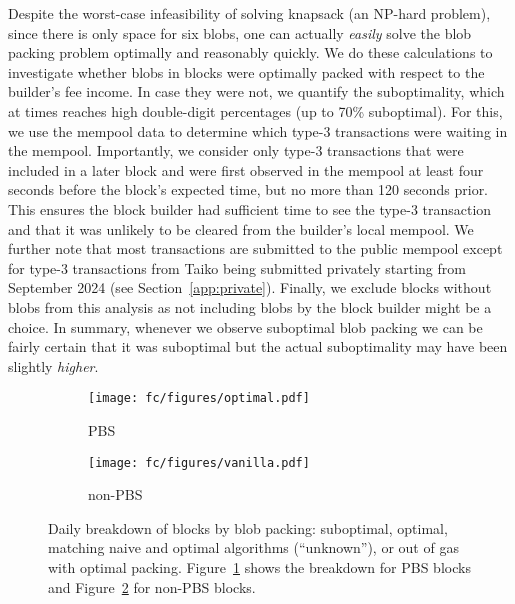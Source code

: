 Despite the worst-case infeasibility of solving knapsack (an NP-hard problem), since there is only space for six blobs, one can actually \emph{easily} solve the blob packing problem optimally and reasonably quickly. We do these calculations to investigate whether blobs in blocks were optimally packed with respect to the builder's fee income. In case they were not, we quantify the suboptimality, which at times reaches high double-digit percentages (up to 70\% suboptimal).
For this, we use the mempool data to determine which type-3 transactions were waiting in the mempool. Importantly, we consider only type-3 transactions that were included in a later block and were first observed in the mempool at least four seconds before the block's expected time, but no more than 120 seconds prior. This ensures the block builder had sufficient time to see the type-3 transaction and that it was unlikely to be cleared from the builder’s local mempool. We further note that most transactions are submitted to the public mempool except for type-3 transactions from Taiko being submitted privately starting from September 2024 (see Section~\ref{app:private}). Finally, we exclude blocks without blobs from this analysis as not including blobs by the block builder might be a choice. In summary, whenever we observe suboptimal blob packing we can be fairly certain that it was suboptimal but the actual suboptimality may have been slightly \emph{higher}.

\begin{figure}[t!]\vspace{-6pt}
    \centering
    \begin{subfigure}[t]{0.49\columnwidth}
    \centering
        \texttt{[image: fc/figures/optimal.pdf]}
    \caption{PBS}
    \label{fig:optimal}
    \end{subfigure}\hfill
    \begin{subfigure}[t]{0.49\columnwidth}
    \centering
        \texttt{[image: fc/figures/vanilla.pdf]}
    \caption{non-PBS}
    \label{fig:vanilla}
    \end{subfigure}\vspace{-6pt}    
    \caption{Daily breakdown of blocks by blob packing: suboptimal, optimal, matching naive and optimal algorithms (``unknown''), or out of gas with optimal packing. Figure~\ref{fig:optimal} shows the breakdown for PBS blocks and Figure~\ref{fig:vanilla} for non-PBS blocks.}\label{fig:optimalpacking}
\end{figure}

